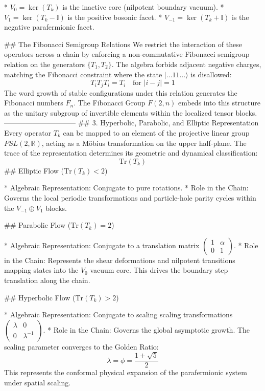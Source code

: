 * $V_0 = \ker(T_k)$ is the inactive core (nilpotent boundary vacuum).
* $V_1 = \ker(T_k - \mathbb{I})$ is the positive bosonic facet.
* $V_{-1} = \ker(T_k + \mathbb{I})$ is the negative parafermionic facet.

## The Fibonacci Semigroup Relations
We restrict the interaction of these operators across a chain by enforcing a non-commutative Fibonacci semigroup relation on the generators $\{T_1, T_2\}$. The algebra forbids adjacent negative charges, matching the Fibonacci constraint where the state $\vert{} \dots 11 \dots \rangle$ is disallowed:
$$T_i T_j T_i = T_i \quad \text{for } \vert{}i-j\vert{} = 1$$ 
The word growth of stable configurations under this relation generates the Fibonacci numbers $F_n$. The Fibonacci Group $F(2, n)$ embeds into this structure as the unitary subgroup of invertible elements within the localized tensor blocks.
------------------------------
## 3. Hyperbolic, Parabolic, and Elliptic Representation
Every operator $T_k$ can be mapped to an element of the projective linear group $PSL(2, \mathbb{R})$, acting as a Möbius transformation on the upper half-plane. The trace of the representation determines its geometric and dynamical classification:
$$\text{Tr}(T_k)$$ 
## Elliptic Flow ($\text{Tr}(T_k) < 2$)

* Algebraic Representation: Conjugate to pure rotations.
* Role in the Chain: Governs the local periodic transformations and particle-hole parity cycles within the $V_{-1} \oplus V_1$ blocks.

## Parabolic Flow ($\text{Tr}(T_k) = 2$)

* Algebraic Representation: Conjugate to a translation matrix $\begin{pmatrix} 1 & \alpha \\ 0 & 1 \end{pmatrix}$.
* Role in the Chain: Represents the shear deformations and nilpotent transitions mapping states into the $V_0$ vacuum core. This drives the boundary step translation along the chain.

## Hyperbolic Flow ($\text{Tr}(T_k) > 2$)

* Algebraic Representation: Conjugate to scaling scaling transformations $\begin{pmatrix} \lambda & 0 \\ 0 & \lambda^{-1} \end{pmatrix}$.
* Role in the Chain: Governs the global asymptotic growth. The scaling parameter converges to the Golden Ratio:
$$\lambda = \phi = \frac{1+\sqrt{5}}{2}$$ 
This represents the conformal physical expansion of the parafermionic system under spatial scaling.

